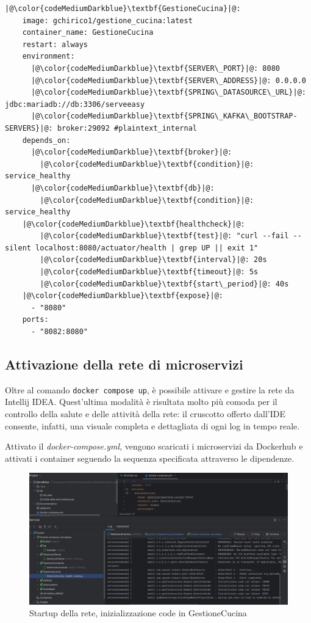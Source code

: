 \begin{lstlisting}[language=docker-compose,caption={GestioneCucina con healthcheck, dipendenze e variabili sovrascritte},label=lst:healthcheck]
|@\color{codeMediumDarkblue}\textbf{GestioneCucina}|@:
    image: gchirico1/gestione_cucina:latest
    container_name: GestioneCucina
    restart: always
    environment:
      |@\color{codeMediumDarkblue}\textbf{SERVER\_PORT}|@: 8080
      |@\color{codeMediumDarkblue}\textbf{SERVER\_ADDRESS}|@: 0.0.0.0
      |@\color{codeMediumDarkblue}\textbf{SPRING\_DATASOURCE\_URL}|@: jdbc:mariadb://db:3306/serveeasy
      |@\color{codeMediumDarkblue}\textbf{SPRING\_KAFKA\_BOOTSTRAP-SERVERS}|@: broker:29092 #plaintext_internal
    depends_on:
      |@\color{codeMediumDarkblue}\textbf{broker}|@:
        |@\color{codeMediumDarkblue}\textbf{condition}|@: service_healthy
      |@\color{codeMediumDarkblue}\textbf{db}|@:
        |@\color{codeMediumDarkblue}\textbf{condition}|@: service_healthy
    |@\color{codeMediumDarkblue}\textbf{healthcheck}|@:
        |@\color{codeMediumDarkblue}\textbf{test}|@: "curl --fail --silent localhost:8080/actuator/health | grep UP || exit 1"
        |@\color{codeMediumDarkblue}\textbf{interval}|@: 20s
        |@\color{codeMediumDarkblue}\textbf{timeout}|@: 5s
        |@\color{codeMediumDarkblue}\textbf{start\_period}|@: 40s
    |@\color{codeMediumDarkblue}\textbf{expose}|@:
      - "8080"
    ports:
      - "8082:8080"
\end{lstlisting}

\subsection{Attivazione della rete di microservizi}
Oltre al comando \texttt{docker compose up}, è possibile attivare e gestire la rete da Intellij IDEA. Quest'ultima modalità è risultata molto più comoda per il controllo della salute e delle attività della rete: il cruscotto offerto dall'IDE consente, infatti, una visuale completa e dettagliata di ogni log in tempo reale. 

Attivato il \textit{docker-compose.yml}, vengono scaricati i microservizi da Dockerhub e attivati i container seguendo la sequenza specificata attraverso le dipendenze.

\begin{figure}[htbp]
	\centering
	\includegraphics[scale=0.40]{iterazione1/images/startup.jpg}
	\caption{Startup della rete, inizializzazione code in GestioneCucina
 \label{fig:startupcucina}}
\end{figure}
\clearpage